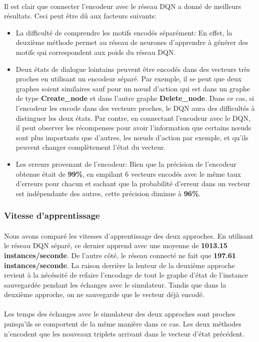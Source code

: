 \paragraph{}Il est clair que connecter l'encodeur avec le réseau DQN a donné de meilleurs résultats. Ceci peut être dû aux facteurs suivants:
\begin{itemize}
	\item La difficulté de comprendre les motifs encodés séparément: En effet, la deuxième méthode permet au réseau de neurones d'apprendre à générer des motifs qui correspondent aux poids du réseau DQN.
	\item Deux états de dialogue lointains peuvent être encodés dans des vecteurs très proches en utilisant un encodeur séparé. Par exemple, il se peut que deux graphes soient similaires sauf pour un n\oe{}ud d'action qui est dans un graphe de type \textbf{Create\_node} et dans l'autre graphe \textbf{Delete\_node}. Dans ce cas, si l'encodeur les encode dans des vecteurs proches, le DQN aura des difficultés à distinguer les deux états. Par contre, en connectant l'encodeur avec le DQN, il peut observer les récompenses pour avoir l'information que certains n\oe{}uds sont plus importants que d'autres, les n\oe{}uds d'action par exemple, et qu'ils peuvent changer complètement l'état du vecteur.
	\item Les erreurs provenant de l'encodeur: Bien que la précision de l'encodeur obtenue était de \textbf{99\%}, en empilant 6 vecteurs encodés avec le même taux d'erreurs pour chacun et sachant que la probabilité d'erreur dans un vecteur est indépendante des autres, cette précision diminue à \textbf{96\%}.
\end{itemize}
\subsubsection{Vitesse d'apprentissage}
\paragraph{}Nous avons comparé les vitesses d'apprentissage des deux approches. En utilisant le réseau DQN séparé, ce dernier apprend avec une moyenne de \textbf{1013.15 instances/seconde}. De l'autre côté, le réseau connecté ne fait que \textbf{197.61 instances/seconde}. La raison derrière la lenteur de la deuxième approche revient à la nécéssité de refaire l'encodage de tout le graphe d'état de l'instance sauvegardée pendant les échanges avec le simulateur. Tandis que dans la deuxième approche, on ne sauvegarde que le vecteur déjà encodé.\\\\
Les temps des échanges avec le simulateur des deux approches sont proches puisqu'ils se comportent de la même manière dans ce cas. Les deux méthodes n'encodent que les nouveaux triplets arrivant dans le vecteur d'état précédent. 
